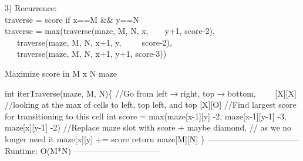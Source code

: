 \documentclass[12pt]{article}
\begin{document}
\pagebreak


3) Recurrence:\\
traverse = score if x==M \&\& y==N\\
traverse = max(traverse(maze, M, N, x,\ \ \ \ y+1, score-2),\\
\indent \indent \indent \indent \ \ \ traverse(maze, M, N, x+1, y,\ \ \ \ \ score-2),\\
\indent \indent \indent \indent \ \ \ traverse(maze, M, N, x+1, y+1, score-3))\\



\begin{algorithm}[H]
\caption{Maximize score in M x N maze}
\begin{algorithmic} [1]
\State int iterTraverse(maze, M, N)\{
\State 
\State //Go from left$\to$right, top$\to$bottom, \indent \indent \indent \ \ \ \ [X][X]
\State //looking at the max of cells to left, top left, and top  [X][O]
\State 
{}
\State //Find largest score for transitioning to this cell
\State int score = max(maze[x-1][y] -2, maze[x-1][y-1] -3, maze[x][y-1] -2)
\State 
\State //Replace maze slot with score + maybe diamond, 
\State // as we no longer need it
\State maze[x][y] += score
\EndFor
\EndFor
\State 
\State return maze[M][N]
\State \}
\State 
\State 
\State --------------------------------- Runtime: O(M*N) --------------------------------
\end{algorithmic}
\end{algorithm}

\end{document}

